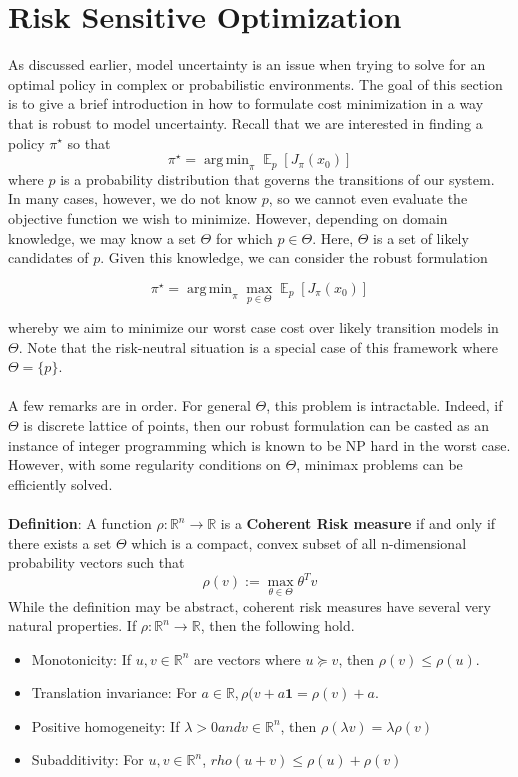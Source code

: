 \documentclass[twoside]{article}
\DeclareMathOperator*{\argmin}{arg\,min}
\DeclareMathOperator{\EX}{\mathbb{E}}
\begin{document}
\section{Risk Sensitive Optimization}
As discussed earlier, model uncertainty is an issue when trying to solve for an optimal policy in complex
or probabilistic environments. The goal of this section is to give a brief introduction in how to formulate
cost minimization in a way that is robust to model uncertainty. Recall that we are interested in finding a
policy $\pi^\star$ so that
$$\pi^\star=\argmin_\pi\EX_p[J_\pi(x_0)]$$
where $p$ is a probability distribution that governs the transitions of our system. In many cases, however,
we do not know $p$, so we cannot even evaluate the objective function we wish to minimize. However,
depending on domain knowledge, we may know a set $\Theta$ for which $p\in\Theta$. Here, $\Theta$ is a set of likely
candidates of $p$. Given this knowledge, we can consider the robust formulation

$$\pi^\star=\argmin_\pi\max_{p\in\Theta}\EX_p[J_\pi(x_0)]$$

whereby we aim to minimize our worst case cost over likely transition models in $\Theta$. Note that the risk-neutral situation is a special case of this framework where $\Theta=\{ p \}$.
\\
\\
A few remarks are in order. For general $\Theta$, this problem is intractable. Indeed, if $\Theta$ is discrete lattice of points, then our robust formulation can be casted as an instance of integer programming which is known to be NP hard in the worst case. However, with some regularity conditions on $\Theta$, minimax problems can
be efficiently solved.
\\
\\
\textbf{Definition}: A function $\rho: \mathbb{R}^n \xrightarrow{} \mathbb{R}$ is a \textbf{Coherent Risk measure} if and only if there exists a set $\Theta$ which is a compact, convex subset of all n-dimensional probability vectors such that
$$\rho(v):=\max_{\theta\in\Theta}\theta^Tv$$
While the definition may be abstract, coherent risk measures have several very natural properties. If $\rho: \mathbb{R}^n \xrightarrow{} \mathbb{R}$, then the following hold.
\begin{itemize}
    \item Monotonicity: If $u, v \in \mathbb{R}^n$ are vectors where $u \succeq v$, then $\rho(v) \leq \rho(u)$.
    \item Translation invariance: For $a\in \mathbb{R}, \rho(v+a \textbf{1}=\rho(v)+a$.
    \item Positive homogeneity: If $\lambda > 0 and v \in \mathbb{R}^n$, then $\rho(\lambda v)=\lambda\rho(v)$
    \item Subadditivity: For $u, v \in \mathbb{R}^n$, $rho(u+v) \leq \rho(u) + \rho(v)$
\end{itemize}
\end{document}
